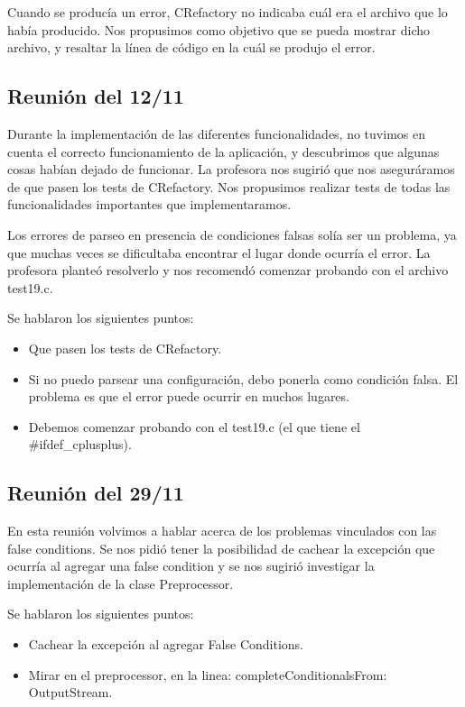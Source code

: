 \documentclass[a4paper,oneside,12pt]{article}
\begin{document}
Cuando se producía un error, CRefactory no indicaba cu\'al era el archivo que lo hab\'ia producido. Nos propusimos como objetivo que se pueda mostrar dicho archivo, y resaltar la l\'inea de c\'odigo en la cu\'al se produjo el error.

\subsection{Reuni\'on del 12/11}
Durante la implementaci\'on de las diferentes funcionalidades, no tuvimos en cuenta el correcto funcionamiento de la aplicaci\'on, y descubrimos que algunas cosas hab\'ian dejado de funcionar. La profesora nos sugiri\'o que nos asegur\'aramos de que pasen los tests de CRefactory. Nos propusimos realizar tests de todas las funcionalidades importantes que implementaramos.

Los errores de parseo en presencia de condiciones falsas sol\'ia ser un problema, ya que muchas veces se dificultaba encontrar el lugar donde ocurr\'ia el error. La profesora plante\'o resolverlo y nos recomend\'o comenzar probando con el archivo test19.c.

Se hablaron los siguientes puntos:
\begin{itemize}
\item Que pasen los tests de CRefactory.
\item Si no puedo parsear una configuraci\'on, debo ponerla como condici\'on falsa.  El problema es que el error puede ocurrir en muchos lugares.
\item Debemos comenzar probando con el test19.c (el que tiene el \#ifdef\_cplusplus).
\end{itemize}

\subsection{Reuni\'on del 29/11}
En esta reuni\'on volvimos a hablar acerca de los problemas vinculados con las false conditions. Se nos pidi\'o tener la posibilidad de cachear la excepci\'on que ocurr\'ia al agregar una false condition y se nos sugiri\'o investigar la implementaci\'on de la clase Preprocessor.

Se hablaron los siguientes puntos:
\begin{itemize}
\item Cachear la excepci\'on al agregar False Conditions. 
\item Mirar en el preprocessor, en la linea: completeConditionalsFrom: OutputStream.
\end{itemize}
\end{document}
